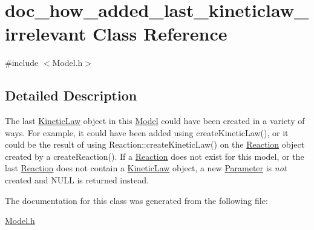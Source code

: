 \hypertarget{classdoc__how__added__last__kineticlaw__irrelevant}{}\section{doc\+\_\+how\+\_\+added\+\_\+last\+\_\+kineticlaw\+\_\+irrelevant Class Reference}
\label{classdoc__how__added__last__kineticlaw__irrelevant}


{\ttfamily \#include $<$Model.\+h$>$}



\subsection{Detailed Description}
\begin{DoxyParagraph}{}
The last \hyperlink{class_kinetic_law}{Kinetic\+Law} object in this \hyperlink{class_model}{Model} could have been created in a variety of ways. For example, it could have been added using create\+Kinetic\+Law(), or it could be the result of using Reaction\+::create\+Kinetic\+Law() on the \hyperlink{class_reaction}{Reaction} object created by a create\+Reaction(). If a \hyperlink{class_reaction}{Reaction} does not exist for this model, or the last \hyperlink{class_reaction}{Reaction} does not contain a \hyperlink{class_kinetic_law}{Kinetic\+Law} object, a new \hyperlink{class_parameter}{Parameter} is {\itshape not} created and {\ttfamily N\+U\+LL} is returned instead. 
\end{DoxyParagraph}


The documentation for this class was generated from the following file\+:\begin{DoxyCompactItemize}
\item 
\hyperlink{_model_8h}{Model.\+h}\end{DoxyCompactItemize}
